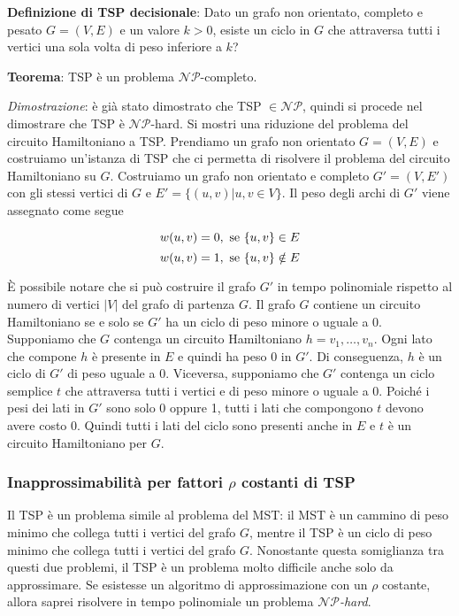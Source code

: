 \textbf{Definizione di TSP decisionale}: Dato un grafo non orientato, completo e pesato
$G = (V,E)$ e un valore $k > 0$, esiste un ciclo in $G$ che attraversa tutti i vertici una
sola volta di peso inferiore a $k$?

\textbf{Teorema}: TSP è un problema $\mathcal{NP}$-completo.

\textit{Dimostrazione}: è già stato dimostrato che TSP $\in \mathcal{NP}$, quindi si procede nel dimostrare
che TSP è $\mathcal{NP}$-hard. Si mostri una riduzione del problema del circuito Hamiltoniano a TSP.
Prendiamo un grafo non orientato $G = (V,E)$ e costruiamo un'istanza di TSP che ci permetta di risolvere
il problema del circuito Hamiltoniano su $G$. Costruiamo un grafo non orientato e completo $G' = (V, E')$
con gli stessi vertici di $G$ e $E' = \{(u, v) | u, v \in V\}$. Il peso degli archi di $G'$ viene assegnato
come segue

\[
    w(u, v) = 0, \textnormal{ se } \{u, v\} \in E
\]
\[
    w(u, v) = 1, \textnormal{ se } \{u, v\} \notin E
\]

È possibile notare che si può costruire il grafo $G'$ in tempo polinomiale rispetto al numero
di vertici $|V|$ del grafo di partenza $G$. Il grafo $G$ contiene un circuito Hamiltoniano se e
solo se $G'$ ha un ciclo di peso minore o uguale a 0. Supponiamo che $G$ contenga un circuito
Hamiltoniano $h = v_1, \dots, v_n$. Ogni lato che compone $h$ è presente in $E$ e quindi ha peso 0 in $G'$.
Di conseguenza, $h$ è un ciclo di $G'$ di peso uguale a 0. Viceversa, supponiamo che $G'$ contenga un ciclo
semplice $t$ che attraversa tutti i vertici e di peso minore o uguale a 0. Poiché i pesi dei lati
in $G'$ sono solo 0 oppure 1, tutti i lati che compongono $t$ devono avere costo 0. Quindi tutti i
lati del ciclo sono presenti anche in $E$ e $t$ è un circuito Hamiltoniano per $G$.

\subsubsection{Inapprossimabilità per fattori $\rho$ costanti di TSP}

Il TSP è un problema simile al problema del MST: il MST è un cammino di peso minimo
che collega tutti i vertici del grafo $G$, mentre il TSP è un ciclo di peso minimo
che collega tutti i vertici del grafo $G$. Nonostante questa somiglianza tra questi
due problemi, il TSP è un problema molto difficile anche solo da approssimare. Se
esistesse un algoritmo di approssimazione con un $\rho$ costante, allora saprei
risolvere in tempo polinomiale un problema \textit{$\mathcal{NP}$-hard}.

